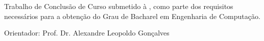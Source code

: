 \begin{titlepage}
	\vfill
	\begin{center}
		\ABNTautordata \\[5cm]
		
		\tituloformat{\ABNTtitulodata} 
		\tituloformat{\subtitulodata} \\[1cm]
		
		\vspace{1cm}
		
		\hspace{.45\textwidth} %
		\begin{minipage}{.5\textwidth}
			\begin{espacosimples}
				
				\textnormal{Trabalho de Conclusão de Curso submetido à \ABNTinstituicaodata,
				como parte dos requisitos necessários para a obtenção do Grau de
				Bacharel em Engenharia de Computação.}
				
				\textnormal{Orientador: Prof. Dr. Alexandre Leopoldo Gonçalves}
			\end{espacosimples}
		\end{minipage}
		
		\vfill 
		\localformat \ABNTlocaldata\\
		
		\vspace{0.5cm}
		
		\anodata
	
	\end{center}
	\vspace{1cm}
\end{titlepage}


